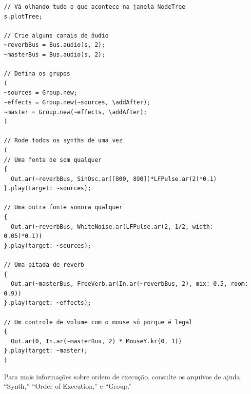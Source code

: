 \begin{lstlisting}[style=SuperCollider-IDE, basicstyle=\scttfamily\footnotesize]
// Vá olhando tudo o que acontece na janela NodeTree
s.plotTree;

// Crie alguns canais de áudio
~reverbBus = Bus.audio(s, 2);
~masterBus = Bus.audio(s, 2);

// Defina os grupos
(
~sources = Group.new;
~effects = Group.new(~sources, \addAfter);
~master = Group.new(~effects, \addAfter);
)

// Rode todos os synths de uma vez
(
// Uma fonte de som qualquer
{
  Out.ar(~reverbBus, SinOsc.ar([800, 890])*LFPulse.ar(2)*0.1)
}.play(target: ~sources);

// Uma outra fonte sonora qualquer
{
  Out.ar(~reverbBus, WhiteNoise.ar(LFPulse.ar(2, 1/2, width: 0.05)*0.1))
}.play(target: ~sources);

// Uma pitada de reverb
{
  Out.ar(~masterBus, FreeVerb.ar(In.ar(~reverbBus, 2), mix: 0.5, room: 0.9))
}.play(target: ~effects);

// Um controle de volume com o mouse só porque é legal
{
  Out.ar(0, In.ar(~masterBus, 2) * MouseY.kr(0, 1))
}.play(target: ~master);
)
\end{lstlisting}

Para mais informações sobre ordem de execução, consulte os arquivos de ajuda ``Synth,'' ``Order of Execution,'' e ``Group.''